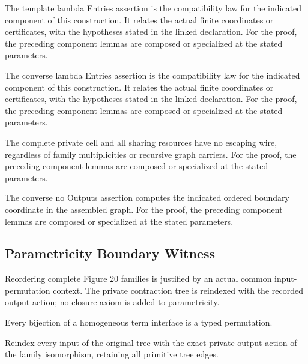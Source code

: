 The template lambda Entries assertion is the compatibility law for the indicated component of this construction. It relates the actual finite coordinates or certificates, with the hypotheses stated in the linked declaration.
For the proof, the preceding component lemmas are composed or specialized at the stated parameters.
\par{}

The converse lambda Entries assertion is the compatibility law for the indicated component of this construction. It relates the actual finite coordinates or certificates, with the hypotheses stated in the linked declaration.
For the proof, the preceding component lemmas are composed or specialized at the stated parameters.
\par{}

The complete private cell and all sharing resources have no escaping wire, regardless of family multiplicities or recursive graph carriers.
For the proof, the preceding component lemmas are composed or specialized at the stated parameters.
\par{}

The converse no Outputs assertion computes the indicated ordered boundary coordinate in the assembled graph.
For the proof, the preceding component lemmas are composed or specialized at the stated parameters.
\par{}

\subsection{Parametricity Boundary Witness}
Reordering complete Figure 20 families is justified by an actual common input-permutation context. The private contraction tree is reindexed with the recorded output action; no closure axiom is added to parametricity.

Every bijection of a homogeneous term interface is a typed permutation.
\par{}

Reindex every input of the original tree with the exact private-output action of the family isomorphism, retaining all primitive tree edges.
\par{}


